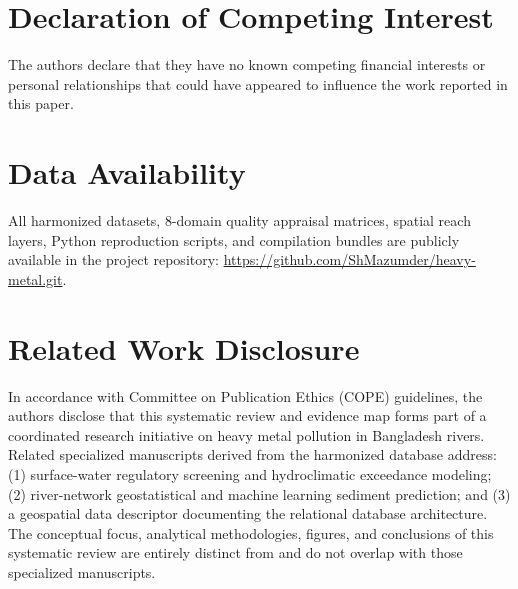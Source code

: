 \documentclass[authoryear,preprint,12pt]{elsarticle}
\begin{document}
\section*{Declaration of Competing Interest}
The authors declare that they have no known competing financial interests or personal relationships that could have appeared to influence the work reported in this paper.

\section*{Data Availability}
All harmonized datasets, 8-domain quality appraisal matrices, spatial reach layers, Python reproduction scripts, and compilation bundles are publicly available in the project repository: \url{https://github.com/ShMazumder/heavy-metal.git}.

\section*{Related Work Disclosure}
In accordance with Committee on Publication Ethics (COPE) guidelines, the authors disclose that this systematic review and evidence map forms part of a coordinated research initiative on heavy metal pollution in Bangladesh rivers. Related specialized manuscripts derived from the harmonized database address: (1) surface-water regulatory screening and hydroclimatic exceedance modeling; (2) river-network geostatistical and machine learning sediment prediction; and (3) a geospatial data descriptor documenting the relational database architecture. The conceptual focus, analytical methodologies, figures, and conclusions of this systematic review are entirely distinct from and do not overlap with those specialized manuscripts.



\end{document}

